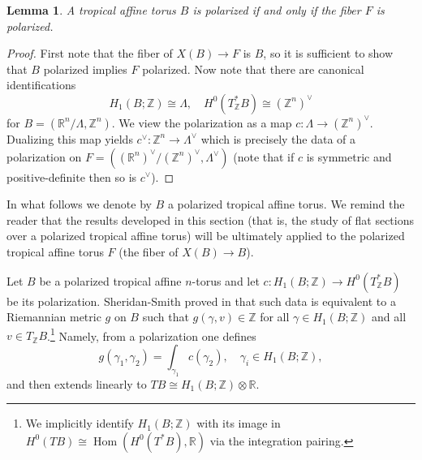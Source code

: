 \documentclass[10pt]{amsart}
\newtheorem{lem}[thm]{Lemma}
\theoremstyle{definition}
\theoremstyle{remark}
\def\R{\mathbb{R}}
\def\Z{\mathbb{Z}}
\DeclareMathOperator{\Hom}{Hom}
\begin{document}
\begin{lem}
    A tropical affine torus $B$ is polarized if and only if the fiber $F$ is polarized.
\end{lem}
\begin{proof}
    First note that the fiber of $X(B) \to F$ is $B$, so it is sufficient to show that $B$ polarized implies $F$ polarized.
    Now note that there are canonical identifications
    $$
    H_1(B;\Z) \cong \Lambda, \quad  
    H^0(T^*_\Z B) \cong (\Z^n)^\vee
    $$
    for $B = (\R^n/\Lambda,\Z^n)$.
    We view the polarization  as a map $c:\Lambda \to (\Z^n)^\vee$.
    Dualizing this map yields $c^\vee: \Z^n \to \Lambda^\vee$ which is precisely the data of a polarization on $F = ((\R^n)^\vee/(\Z^n)^\vee,\Lambda^\vee)$ (note that if $c$ is symmetric and positive-definite then so is $c^\vee$).
\end{proof}

In what follows we denote by $B$ a polarized tropical affine torus. 
We remind the reader that the results developed in this section (that is, the study of flat sections over a polarized tropical affine torus) will be ultimately applied to the polarized tropical affine torus $F$ (the fiber of $X(B) \to B$).

Let $B$ be a polarized tropical affine $n$-torus and let $c: H_1(B;\Z) \to H^0(T^*_\Z B)$ be its polarization.
Sheridan-Smith proved in \cite[Lemma 3.9]{sheridan2021lagrangian} that such data is equivalent to a Riemannian metric $g$ on $B$ such that $g(\gamma,v) \in \Z$ for all $\gamma \in H_1(B;\Z)$ and all $v \in T_\Z B$.\footnote{We implicitly identify $H_1(B;\Z)$ with its image in $H^0(TB) \cong \Hom(H^0(T^*B),\R)$ via the integration pairing.}
Namely, from a polarization one defines 
\begin{equation}\label{eq:metricfrompolarisation}
    g(\gamma_1,\gamma_2) = \int_{\gamma_1} c(\gamma_2), \quad \gamma_i \in H_1(B;\Z),
\end{equation}
and then extends linearly to $TB \cong H_1(B;\Z)\otimes\R$.
\end{document}
